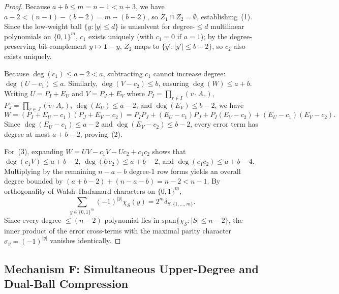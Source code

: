 \documentclass[11pt,a4paper]{article}
\newcommand{\wt}[1]{|#1|}
\begin{document}
\begin{proof}
Because $a + b \le m = n - 1 < n + 3$, we have $a - 2 < (n - 1) - (b - 2) = m - (b - 2)$, so $Z_1 \cap Z_2 = \emptyset$, establishing~(1). Since the low-weight ball $\{y : \wt{y} \le d\}$ is unisolvent for degree-$\le d$ multilinear polynomials on $\{0,1\}^m$, $c_1$ exists uniquely (with $c_1 = 0$ if $a = 1$); by the degree-preserving bit-complement $y \mapsto \mathbf{1} - y$, $Z_2$ maps to $\{y' : \wt{y'} \le b - 2\}$, so $c_2$ also exists uniquely.

Because $\deg(c_1) \le a - 2 < a$, subtracting $c_1$ cannot increase degree: $\deg(U - c_1) \le a$. Similarly, $\deg(V - c_2) \le b$, ensuring $\deg(W) \le a + b$. Writing $U = P_I + E_U$ and $V = P_J + E_V$ where $P_I = \prod_{r \in I} (v \cdot A_r)$, $P_J = \prod_{r \in J} (v \cdot A_r)$, $\deg(E_U) \le a - 2$, and $\deg(E_V) \le b - 2$, we have
\begin{equation}
W = (P_I + E_U - c_1)(P_J + E_V - c_2) = P_I P_J + (E_U - c_1) P_J + P_I (E_V - c_2) + (E_U - c_1)(E_V - c_2).
\end{equation}
Since $\deg(E_U - c_1) \le a - 2$ and $\deg(E_V - c_2) \le b - 2$, every error term has degree at most $a + b - 2$, proving~(2).

For~(3), expanding $W = UV - c_1 V - U c_2 + c_1 c_2$ shows that $\deg(c_1 V) \le a + b - 2$, $\deg(U c_2) \le a + b - 2$, and $\deg(c_1 c_2) \le a + b - 4$. Multiplying by the remaining $n - a - b$ degree-1 row forms yields an overall degree bounded by $(a + b - 2) + (n - a - b) = n - 2 < n - 1$. By orthogonality of Walsh--Hadamard characters on $\{0, 1\}^m$,
\begin{equation}
\sum_{y \in \{0, 1\}^m} (-1)^{\wt{y}} \chi_S(y) = 2^m \delta_{S, \{1, \dots, m\}}.
\end{equation}
Since every degree-$\le (n - 2)$ polynomial lies in $\mathrm{span}\{\chi_S : \wt{S} \le n - 2\}$, the inner product of the error cross-terms with the maximal parity character $\sigma_y = (-1)^{\wt{y}}$ vanishes identically.
\end{proof}

\subsection{Mechanism F: Simultaneous Upper-Degree and Dual-Ball Compression}
\end{document}
